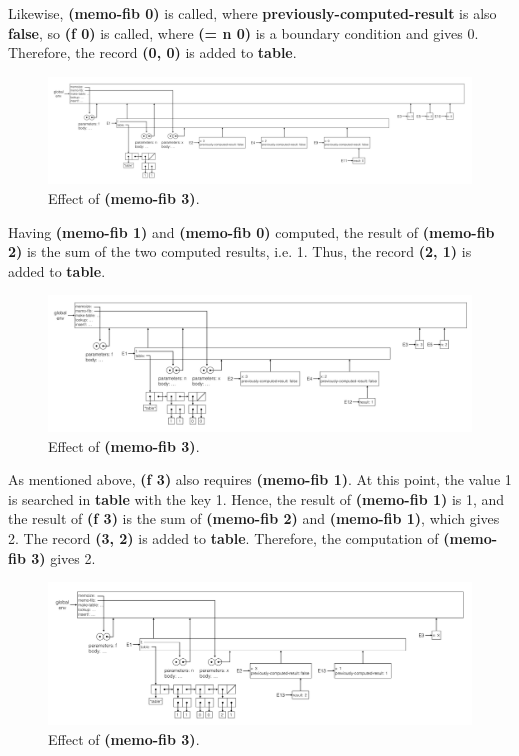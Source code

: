 \documentclass[11pt, oneside]{article}
\begin{document}
Likewise, \textbf{(memo-fib 0)} is called, where \textbf{previously-computed-result} is also \textbf{false}, so \textbf{(f 0)} is called, where \textbf{(= n 0)} is a boundary condition and gives 0. Therefore, the record \textbf{(0, 0)} is added to \textbf{table}.

\begin{figure}[h!]
    \centering\includegraphics[width=15cm]{ex-3.27-3.png}
    \caption{Effect of \textbf{(memo-fib 3)}.}
\end{figure}

Having \textbf{(memo-fib 1)} and \textbf{(memo-fib 0)} computed, the result of \textbf{(memo-fib 2)} is the sum of the two computed results, i.e. 1. Thus, the record \textbf{(2, 1)} is added to \textbf{table}.

\begin{figure}[h!]
    \centering\includegraphics[width=15cm]{ex-3.27-4.png}
    \caption{Effect of \textbf{(memo-fib 3)}.}
\end{figure}

As mentioned above, \textbf{(f 3)} also requires \textbf{(memo-fib 1)}. At this point, the value 1 is searched in \textbf{table} with the key 1. Hence, the result of \textbf{(memo-fib 1)} is 1, and the result of \textbf{(f 3)} is the sum of \textbf{(memo-fib 2)} and \textbf{(memo-fib 1)}, which gives 2. The record \textbf{(3, 2)} is added to \textbf{table}. Therefore, the computation of \textbf{(memo-fib 3)} gives 2.

\begin{figure}[h!]
    \centering\includegraphics[width=15cm]{ex-3.27-5.png}
    \caption{Effect of \textbf{(memo-fib 3)}.}
\end{figure}
\end{document}
